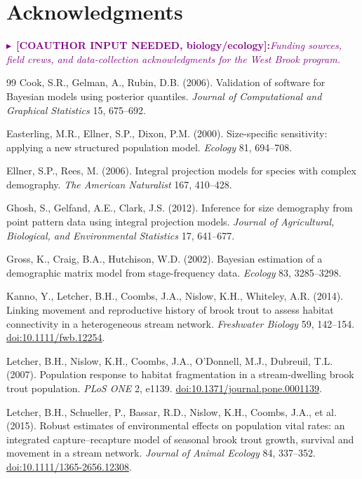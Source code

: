 \documentclass[11pt]{article}
\newcommand{\doi}[1]{\href{https://doi.org/#1}{doi:#1}}
\newcommand{\needbio}[1]{%
  \par\smallskip\noindent%
  \textcolor{purple}{$\blacktriangleright$~\textbf{[COAUTHOR INPUT NEEDED, biology/ecology]:}\space\textit{#1}}%
  \par\smallskip}
\begin{document}
\section*{Acknowledgments}
\needbio{Funding sources, field crews, and data-collection acknowledgments for
the West Brook program.}

\begin{thebibliography}{99}
\small
{} Cook, S.R., Gelman, A., Rubin, D.B. (2006).
Validation of software for Bayesian models using posterior quantiles.
\emph{Journal of Computational and Graphical Statistics} 15, 675--692.

 Easterling, M.R., Ellner, S.P.,
Dixon, P.M. (2000). Size-specific sensitivity: applying a new structured
population model. \emph{Ecology} 81, 694--708.

 Ellner, S.P., Rees, M. (2006).
Integral projection models for species with complex demography. \emph{The
American Naturalist} 167, 410--428.

 Ghosh, S., Gelfand, A.E., Clark, J.S.
(2012). Inference for size demography from point pattern data using integral
projection models. \emph{Journal of Agricultural, Biological, and Environmental
Statistics} 17, 641--677.

 Gross, K., Craig, B.A., Hutchison, W.D.
(2002). Bayesian estimation of a demographic matrix model from stage-frequency
data. \emph{Ecology} 83, 3285--3298.

 Kanno, Y., Letcher, B.H., Coombs, J.A.,
Nislow, K.H., Whiteley, A.R. (2014). Linking movement and reproductive history of
brook trout to assess habitat connectivity in a heterogeneous stream network.
\emph{Freshwater Biology} 59, 142--154. \doi{10.1111/fwb.12254}.

 Letcher, B.H., Nislow, K.H., Coombs,
J.A., O'Donnell, M.J., Dubreuil, T.L. (2007). Population response to habitat
fragmentation in a stream-dwelling brook trout population. \emph{PLoS ONE} 2,
e1139. \doi{10.1371/journal.pone.0001139}.

 Letcher, B.H., Schueller, P., Bassar,
R.D., Nislow, K.H., Coombs, J.A., et al. (2015). Robust estimates of environmental
effects on population vital rates: an integrated capture--recapture model of
seasonal brook trout growth, survival and movement in a stream network.
\emph{Journal of Animal Ecology} 84, 337--352. \doi{10.1111/1365-2656.12308}.


\end{thebibliography}
\end{document}
